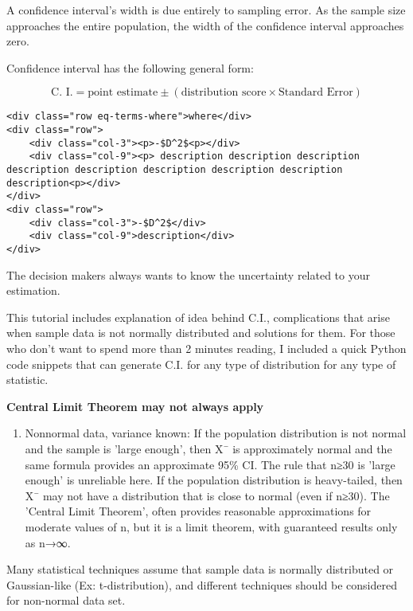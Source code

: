 \documentclass[11pt]{article}
\providecommand{\tightlist}{%
      \setlength{\itemsep}{0pt}\setlength{\parskip}{0pt}}
\begin{document}
    A confidence interval's width is due entirely to sampling error. As the
sample size approaches the entire population, the width of the
confidence interval approaches zero.

    Confidence interval has the following general form:

\hypertarget{eq-1}{}
\[ \text{C. I.} = \text{point estimate} \pm (\text{distribution score} \times \text{Standard Error}) \tag{1} \]

\begin{verbatim}
<div class="row eq-terms-where">where</div>
<div class="row">
    <div class="col-3"><p>-$D^2$<p></div>
    <div class="col-9"><p> description description description description description description description description description<p></div>
</div>
<div class="row">
    <div class="col-3">-$D^2$</div>
    <div class="col-9">description</div>
</div>    
\end{verbatim}

The decision makers always wants to know the uncertainty related to your
estimation.

This tutorial includes explanation of idea behind C.I., complications
that arise when sample data is not normally distributed and solutions
for them. For those who don't want to spend more than 2 minutes reading,
I included a quick Python code snippets that can generate C.I. for any
type of distribution for any type of statistic.

\textbf{Central Limit Theorem may not always apply}

\begin{enumerate}
\def\labelenumi{\arabic{enumi}.}
\setcounter{enumi}{1}
\tightlist
\item
  Nonnormal data, variance known: If the population distribution is not
  normal and the sample is 'large enough', then X¯ is approximately
  normal and the same formula provides an approximate 95\% CI. The rule
  that n≥30 is 'large enough' is unreliable here. If the population
  distribution is heavy-tailed, then X¯ may not have a distribution that
  is close to normal (even if n≥30). The 'Central Limit Theorem', often
  provides reasonable approximations for moderate values of n, but it is
  a limit theorem, with guaranteed results only as n→∞.
\end{enumerate}

Many statistical techniques assume that sample data is normally
distributed or Gaussian-like (Ex: t-distribution), and different
techniques should be considered for non-normal data set.
\end{document}
